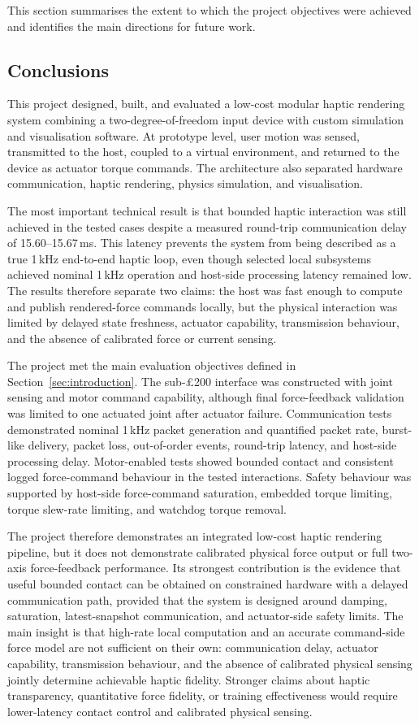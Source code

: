 \noindent
This section summarises the extent to which the project objectives were achieved and identifies the main directions for future work.

\subsection{Conclusions}

This project designed, built, and evaluated a low-cost modular haptic rendering system combining a two-degree-of-freedom input device with custom simulation and visualisation software. At prototype level, user motion was sensed, transmitted to the host, coupled to a virtual environment, and returned to the device as actuator torque commands. The architecture also separated hardware communication, haptic rendering, physics simulation, and visualisation.

The most important technical result is that bounded haptic interaction was still achieved in the tested cases despite a measured round-trip communication delay of 15.60--15.67\,ms. This latency prevents the system from being described as a true 1\,kHz end-to-end haptic loop, even though selected local subsystems achieved nominal 1\,kHz operation and host-side processing latency remained low. The results therefore separate two claims: the host was fast enough to compute and publish rendered-force commands locally, but the physical interaction was limited by delayed state freshness, actuator capability, transmission behaviour, and the absence of calibrated force or current sensing.

The project met the main evaluation objectives defined in Section~\ref{sec:introduction}. The sub-£200 interface was constructed with joint sensing and motor command capability, although final force-feedback validation was limited to one actuated joint after actuator failure. Communication tests demonstrated nominal 1\,kHz packet generation and quantified packet rate, burst-like delivery, packet loss, out-of-order events, round-trip latency, and host-side processing delay. Motor-enabled tests showed bounded contact and consistent logged force-command behaviour in the tested interactions. Safety behaviour was supported by host-side force-command saturation, embedded torque limiting, torque slew-rate limiting, and watchdog torque removal.

The project therefore demonstrates an integrated low-cost haptic rendering pipeline, but it does not demonstrate calibrated physical force output or full two-axis force-feedback performance. Its strongest contribution is the evidence that useful bounded contact can be obtained on constrained hardware with a delayed communication path, provided that the system is designed around damping, saturation, latest-snapshot communication, and actuator-side safety limits. The main insight is that high-rate local computation and an accurate command-side force model are not sufficient on their own: communication delay, actuator capability, transmission behaviour, and the absence of calibrated physical sensing jointly determine achievable haptic fidelity. Stronger claims about haptic transparency, quantitative force fidelity, or training effectiveness would require lower-latency contact control and calibrated physical sensing.

